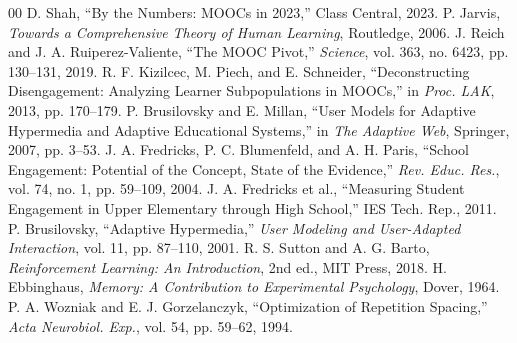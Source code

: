 \documentclass[conference]{IEEEtran}
\begin{document}
\begin{thebibliography}{00}
 D. Shah, ``By the Numbers: MOOCs in 2023,'' Class Central, 2023.
 P. Jarvis, \textit{Towards a Comprehensive Theory of Human Learning}, Routledge, 2006.
 J. Reich and J. A. Ruiperez-Valiente, ``The MOOC Pivot,'' \textit{Science}, vol. 363, no. 6423, pp. 130--131, 2019.
 R. F. Kizilcec, M. Piech, and E. Schneider, ``Deconstructing Disengagement: Analyzing Learner Subpopulations in MOOCs,'' in \textit{Proc. LAK}, 2013, pp. 170--179.
 P. Brusilovsky and E. Millan, ``User Models for Adaptive Hypermedia and Adaptive Educational Systems,'' in \textit{The Adaptive Web}, Springer, 2007, pp. 3--53.
 J. A. Fredricks, P. C. Blumenfeld, and A. H. Paris, ``School Engagement: Potential of the Concept, State of the Evidence,'' \textit{Rev. Educ. Res.}, vol. 74, no. 1, pp. 59--109, 2004.
 J. A. Fredricks et al., ``Measuring Student Engagement in Upper Elementary through High School,'' IES Tech. Rep., 2011.
 P. Brusilovsky, ``Adaptive Hypermedia,'' \textit{User Modeling and User-Adapted Interaction}, vol. 11, pp. 87--110, 2001.
 R. S. Sutton and A. G. Barto, \textit{Reinforcement Learning: An Introduction}, 2nd ed., MIT Press, 2018.
 H. Ebbinghaus, \textit{Memory: A Contribution to Experimental Psychology}, Dover, 1964.
 P. A. Wozniak and E. J. Gorzelanczyk, ``Optimization of Repetition Spacing,'' \textit{Acta Neurobiol. Exp.}, vol. 54, pp. 59--62, 1994.
\end{thebibliography}
\end{document}
